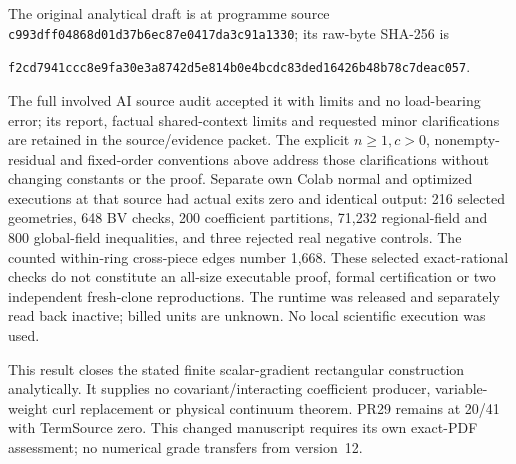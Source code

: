 The original analytical draft is at programme source
\texttt{c993dff04868d01d37b6ec87e0417da3c91a1330}; its raw-byte SHA-256 is
\begin{center}\scriptsize
\texttt{f2cd7941ccc8e9fa30e3a8742d5e814b0e4bcdc83ded16426b48b78c7deac057}.
\end{center}
The full involved AI source audit accepted it with limits and no load-bearing
error; its report, factual shared-context limits and requested minor
clarifications are retained in the source/evidence packet. The explicit
$n\ge1,c>0$, nonempty-residual and fixed-order conventions above address
those clarifications without changing constants or the proof.
Separate own Colab normal and optimized executions at that source had
actual exits zero and identical output: 216 selected geometries,
648 BV checks, 200 coefficient partitions, 71,232 regional-field and
800 global-field inequalities, and three rejected real negative controls.
The counted within-ring cross-piece edges number 1,668. These selected
exact-rational checks do not constitute an all-size executable proof,
formal certification or two independent fresh-clone reproductions.
The runtime was released and separately read back inactive; billed units
are unknown. No local scientific execution was used.

This result closes the stated finite scalar-gradient rectangular
construction analytically. It supplies no covariant/interacting coefficient
producer, variable-weight curl replacement or physical continuum theorem.
PR29 remains at 20/41 with TermSource zero. This changed manuscript requires
its own exact-PDF assessment; no numerical grade transfers from version~12.
